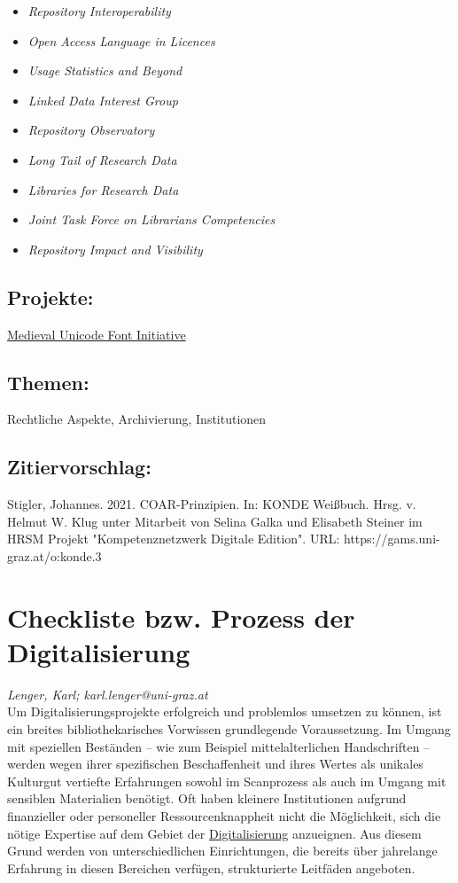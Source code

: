 \documentclass{article}
\begin{document}
        \begin{itemize}\item {\emph{Repository Interoperability}}\item {\emph{Open Access Language in Licences}}\item {\emph{Usage Statistics and Beyond}}\item {\emph{Linked Data Interest Group}}\item {\emph{Repository Observatory}}\item {\emph{Long Tail of Research Data}}\item {\emph{Libraries for Research Data}}\item {\emph{Joint Task Force on Librarians Competencies}}\item {\emph{Repository Impact and Visibility}}\end{itemize}\subsection*{Projekte:}\href{https://folk.uib.no/hnooh/mufi/}{Medieval
                           Unicode Font Initiative}\subsection*{Themen:}Rechtliche Aspekte, Archivierung, Institutionen\subsection*{Zitiervorschlag:}Stigler, Johannes. 2021. COAR-Prinzipien. In: KONDE Weißbuch. Hrsg. v. Helmut W. Klug unter Mitarbeit von Selina Galka und Elisabeth Steiner im HRSM Projekt "Kompetenznetzwerk Digitale Edition". URL: https://gams.uni-graz.at/o:konde.3\newpage\section*{Checkliste bzw. Prozess der Digitalisierung} \emph{Lenger, Karl; karl.lenger@uni-graz.at }\\
        
    Um Digitalisierungsprojekte erfolgreich und problemlos umsetzen zu können, ist ein
                  breites bibliothekarisches Vorwissen grundlegende Voraussetzung. Im Umgang mit
                  speziellen Beständen – wie zum Beispiel mittelalterlichen Handschriften – werden
                  wegen ihrer spezifischen Beschaffenheit und ihres Wertes als unikales Kulturgut
                  vertiefte Erfahrungen sowohl im Scanprozess als auch im Umgang mit sensiblen
                  Materialien benötigt. Oft haben kleinere Institutionen aufgrund finanzieller oder
                  personeller Ressourcenknappheit nicht die Möglichkeit, sich die nötige Expertise
                  auf dem Gebiet der \href{http://gams.uni-graz.at/o:konde.60}{Digitalisierung}
                  anzueignen. Aus diesem Grund werden von unterschiedlichen Einrichtungen, die
                  bereits über jahrelange Erfahrung in diesen Bereichen verfügen, strukturierte
                  Leitfäden angeboten.\\
            
\end{document}
